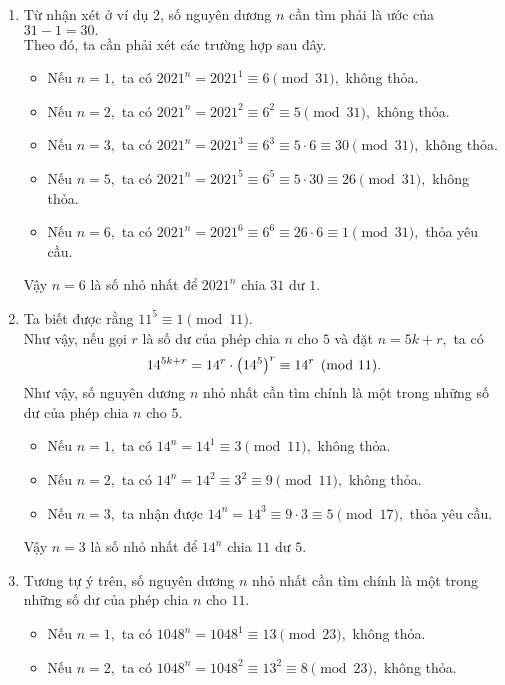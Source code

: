 \begin{gbtt}
{\begin{enumerate}[a,]
    Vậy $n=6$ là số nhỏ nhất để $11^n$ chia $13$ dư $1.$
    \item Từ nhận xét ở ví dụ 2, số nguyên dương $n$ cần tìm phải là ước của $31-1=30.$ \\Theo đó, ta cần phải xét các trường hợp sau đây.
    \begin{itemize}
        \item Nếu $n=1,$ ta có
        $2021^n=2021^1 \equiv 6 \pmod{31},$ không thỏa.
        \item Nếu $n=2,$ ta có
        $2021^n=2021^2 \equiv 6^2 \equiv 5 \pmod{31},$ không thỏa.
        \item Nếu $n=3,$ ta có
        $2021^n=2021^3 \equiv 6^3 \equiv 5\cdot6 \equiv 30 \pmod{31},$ không thỏa.
        \item Nếu $n=5,$ ta có
        $2021^n=2021^5 \equiv 6^5 \equiv 5\cdot30 \equiv 26 \pmod{31},$ không thỏa.
        \item Nếu $n=6,$ ta có
        $2021^n=2021^6 \equiv 6^6 \equiv 26\cdot6 \equiv 1 \pmod{31},$ thỏa yêu cầu.
    \end{itemize}
    Vậy $n=6$ là số nhỏ nhất để $2021^n$ chia $31$ dư $1.$
    \item Ta biết được rằng $11^5\equiv 1\pmod{11}.$\\ Như vậy, nếu gọi $r$ là số dư của phép chia $n$ cho $5$ và đặt $n=5k+r,$ ta có
    $$14^{5k+r}=14^r\cdot\left(\displaystyle 14^5 \right)^r\equiv 14^r\pmod{11}.$$
    Như vậy, số nguyên dương $n$ nhỏ nhất cần tìm chính là một trong những số dư của phép chia $n$ cho $5.$
    \begin{itemize}
        \item Nếu $n=1,$ ta có
        $14^n=14^1 \equiv 3 \pmod{11},$ không thỏa.
        \item Nếu $n=2,$ ta có
        $14^n=14^2 \equiv 3^2 \equiv 9 \pmod{11},$ không thỏa.
        \item Nếu $n=3,$ ta nhận được
        $14^n=14^3  \equiv 9\cdot3 \equiv 5 \pmod{17},$ thỏa yêu cầu. 
    \end{itemize}
    Vậy $n=3$ là số nhỏ nhất để $14^n$ chia $11$ dư $5.$
    \item Tương tự ý trên, số nguyên dương $n$ nhỏ nhất cần tìm chính là một trong những số dư của phép chia $n$ cho $11.$
    \begin{itemize} 
        \item Nếu $n=1,$ ta có
        $1048^n=1048^1 \equiv 13 \pmod{23},$ không thỏa.
        \item Nếu $n=2,$ ta có
        $1048^n=1048^2 \equiv 13^2 \equiv 8 \pmod{23},$ không thỏa.

\end{itemize}
\end{enumerate}}
\end{gbtt}
